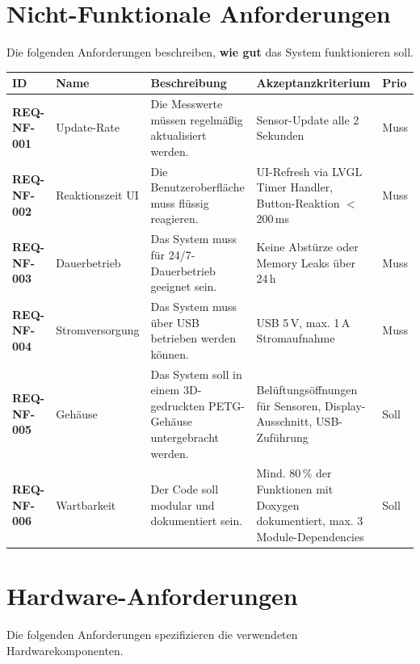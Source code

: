 \documentclass[a4paper,11pt]{article}
\begin{document}
\section{Nicht-Funktionale Anforderungen}

Die folgenden Anforderungen beschreiben, \textbf{wie gut} das System funktionieren soll.

\begin{small}
\begin{longtable}{p{2cm}p{2.2cm}p{4cm}p{4.3cm}p{1cm}}
\toprule
\rowcolor{tableheader}
\textbf{ID} & \textbf{Name} & \textbf{Beschreibung} & \textbf{Akzeptanzkriterium} & \textbf{Prio} \\
\midrule
\endfirsthead
\textbf{REQ-NF-001} & Update-Rate & Die Messwerte müssen regelmäßig aktualisiert werden. & Sensor-Update alle 2 Sekunden & Muss \\[4pt]
\textbf{REQ-NF-002} & Reaktionszeit UI & Die Benutzeroberfläche muss flüssig reagieren. & UI-Refresh via LVGL Timer Handler, Button-Reaktion $<$\,200\,ms & Muss \\[4pt]
\textbf{REQ-NF-003} & Dauerbetrieb & Das System muss für 24/7-Dauerbetrieb geeignet sein. & Keine Abstürze oder Memory Leaks über 24\,h & Muss \\[4pt]
\textbf{REQ-NF-004} & Stromversorgung & Das System muss über USB betrieben werden können. & USB 5\,V, max. 1\,A Stromaufnahme & Muss \\[4pt]
\textbf{REQ-NF-005} & Gehäuse & Das System soll in einem 3D-gedruckten PETG-Gehäuse untergebracht werden. & Belüftungsöffnungen für Sensoren, Display-Ausschnitt, USB-Zuführung & Soll \\[4pt]
\textbf{REQ-NF-006} & Wartbarkeit & Der Code soll modular und dokumentiert sein. & Mind. 80\,\% der Funktionen mit Doxygen dokumentiert, max. 3 Module-Dependencies & Soll \\
\bottomrule
\end{longtable}
\end{small}

\section{Hardware-Anforderungen}

Die folgenden Anforderungen spezifizieren die verwendeten Hardwarekomponenten.
\end{document}
